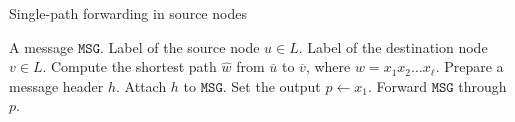 \begin{algorithm}[htbp]
\caption{Single-path forwarding in source nodes}
\label{al:fwd_src_single}
\begin{algorithmic}[1]
	\REQUIRE A message $\texttt{MSG}$.
    \REQUIRE Label of the source node $u\in L$.
	\REQUIRE Label of the destination node $v\in L$.
	\STATE Compute the shortest path $\widehat{w}$ from $\overline{u}$ to $\overline{v}$, where $w=x_1x_2\ldots x_\ell$.  
    \STATE Prepare a message header $h$.  
    \STATE Attach $h$ to $\texttt{MSG}$.
    \STATE Set the output $p\leftarrow x_1$.
    \STATE Forward $\texttt{MSG}$ through $p$.
\end{algorithmic}
\end{algorithm}